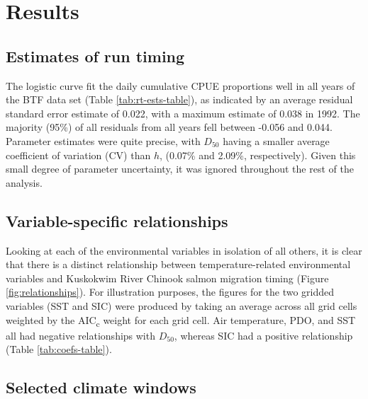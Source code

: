 \documentclass[12pt,]{book}
\theoremstyle{definition}
\theoremstyle{definition}
\theoremstyle{definition}
\theoremstyle{remark}
\begin{document}
\section{Results}\label{results}

\subsection{Estimates of run timing}\label{estimates-of-run-timing}

\noindent
The logistic curve fit the daily cumulative CPUE proportions well in all
years of the BTF data set (Table \ref{tab:rt-ests-table}), as indicated
by an average residual standard error estimate of 0.022, with a maximum
estimate of 0.038 in 1992. The majority (95\%) of all residuals from all
years fell between -0.056 and 0.044. Parameter estimates were quite
precise, with \(D_{50}\) having a smaller average coefficient of
variation (CV) than \(h\), (0.07\% and 2.09\%, respectively). Given this
small degree of parameter uncertainty, it was ignored throughout the
rest of the analysis.

\subsection{Variable-specific
relationships}\label{variable-specific-relationships}

\noindent
Looking at each of the environmental variables in isolation of all
others, it is clear that there is a distinct relationship between
temperature-related environmental variables and Kuskokwim River Chinook
salmon migration timing (Figure \ref{fig:relationships}). For
illustration purposes, the figures for the two gridded variables (SST
and SIC) were produced by taking an average across all grid cells
weighted by the AIC\textsubscript{c} weight for each grid cell. Air
temperature, PDO, and SST all had negative relationships with
\(D_{50}\), whereas SIC had a positive relationship (Table
\ref{tab:coefs-table}).

\subsection{Selected climate windows}\label{selected-climate-windows}
\end{document}
